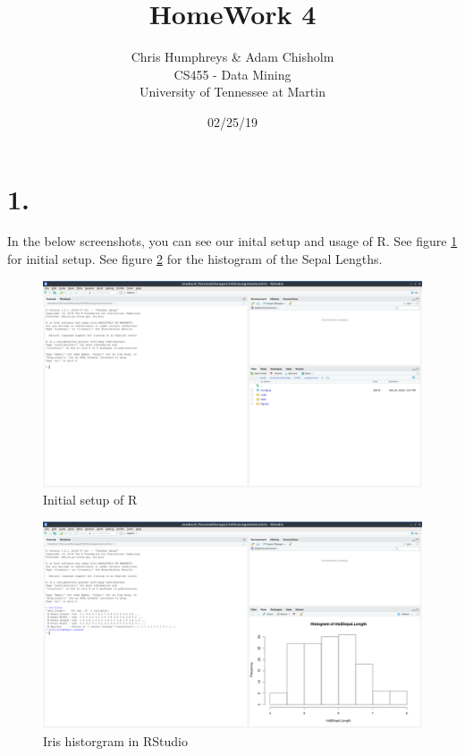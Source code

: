 \documentclass[10pt]{article}
\begin{document}
\date{02/25/19}


\title{HomeWork 4}
\author{Chris Humphreys \& Adam Chisholm\\ 
CS455 - Data Mining\\University of Tennessee at Martin } 

\maketitle
\section*{1.}
In the below screenshots, you can see our inital setup and usage of R.   See 
figure \ref{fig:r1} for initial setup.   See figure \ref{fig:r2} for the 
histogram of the Sepal Lengths. 
\begin{figure}[]
    \includegraphics[width=\textwidth]{initSetup}
    \caption{Initial setup of R}
    \label{fig:r1}
\end{figure}
\begin{figure}[]
    \includegraphics[width=\textwidth]{irisHist}
    \caption{Iris historgram in RStudio}
    \label{fig:r2}
\end{figure}
\end{document}
